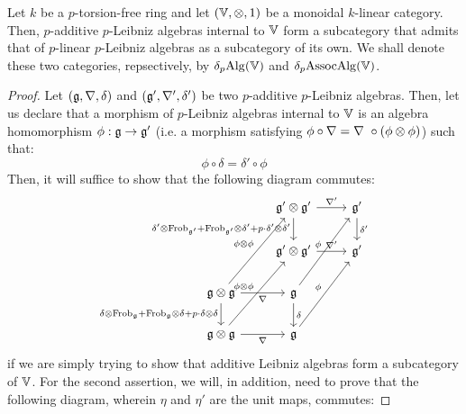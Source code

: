         \begin{claim}
            Let $k$ be a $p$-torsion-free ring and let $(\V, \tensor, 1)$ be a monoidal $k$-linear category. Then, $p$-additive $p$-Leibniz algebras internal to $\mathbb{V}$ form a subcategory that admits that of $p$-linear $p$-Leibniz algebras as a subcategory of its own. We shall denote these two categories, repsectively, by $\delta_p\mathrm{Alg}(\mathbb{V})$ and $\delta_p\mathrm{Assoc}\mathrm{Alg}(\mathbb{V})$.
        \end{claim}
            \begin{proof}
                Let $(\mathfrak{g}, \nabla, \delta)$ and $(\mathfrak{g}', \nabla', \delta')$ be two $p$-additive $p$-Leibniz algebras. Then, let us declare that a morphism of $p$-Leibniz algebras internal to $\mathbb{V}$ is an algebra homomorphism $\phi: \mathfrak{g} \to \mathfrak{g}'$ (i.e. a morphism satisfying $\phi \circ \nabla = \nabla\ \circ (\phi \tensor \phi)$) such that:
                    $$\phi \circ \delta = \delta' \circ \phi$$
                Then, it will suffice to show that the following diagram commutes:
                    $$
                        \begin{tikzcd}
                        	& {\g' \tensor \g'} & {\g'} \\
                        	& {\g' \tensor \g'} & {\g'} \\
                        	{\g \tensor \g} & {\g} \\
                        	{\g \tensor \g} & {\g}
                        	\arrow["{\phi \tensor \phi}", from=3-1, to=1-2]
                        	\arrow["{\phi}", from=3-2, to=1-3]
                        	\arrow["{\phi}", from=4-2, to=2-3]
                        	\arrow["{\delta'}", from=1-3, to=2-3]
                        	\arrow["{\nabla'}", from=1-2, to=1-3]
                        	\arrow["{\delta' \tensor \Frob_{\g'} + \Frob_{\g'} \tensor \delta' + p \cdot \delta' \tensor \delta'}"', from=1-2, to=2-2]
                        	\arrow["{\nabla'}", from=2-2, to=2-3]
                        	\arrow["{\delta}", from=3-2, to=4-2]
                        	\arrow["{\delta \tensor \Frob_{\g} + \Frob_{\g} \tensor \delta + p \cdot \delta \tensor \delta}"', from=3-1, to=4-1]
                        	\arrow["{\nabla}"', from=4-1, to=4-2]
                        	\arrow["{\nabla}"', from=3-1, to=3-2]
                        	\arrow["{\phi \tensor \phi}", from=4-1, to=2-2]
                        \end{tikzcd}
                    $$
                if we are simply trying to show that additive Leibniz algebras form a subcategory of $\mathbb{V}$. For the second assertion, we will, in addition, need to prove that the following diagram, wherein $\eta$ and $\eta'$ are the unit maps, commutes:

\end{proof}

